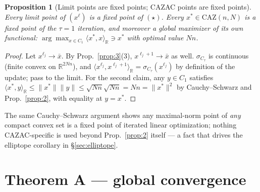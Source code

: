 \documentclass[11pt]{article}
\theoremstyle{plain}
\newtheorem{proposition}[theorem]{Proposition}
\theoremstyle{definition}
\theoremstyle{remark}
\newcommand{\R}{\mathbb R}
\newcommand{\CAZ}{\mathrm{CAZ}}
\begin{document}
\begin{proposition}[Limit points are fixed points; CAZAC points are fixed points]\label{prop:4}
Every limit point of $(x^\ell)$ is a fixed point of $(\star)$. Every
$x^*\in\CAZ(n,N)$ is a fixed point of the $\tau=1$ iteration, and moreover
a global maximizer of its own functional:
$\arg\max_{x\in C_1}\langle x^*,x\rangle_\R\ni x^*$ with optimal value $Nn$.
\end{proposition}
\begin{proof}
Let $x^{\ell_j}\to\bar x$. By Prop.~\ref{prop:3}(3), $x^{\ell_j+1}\to\bar x$
as well. $\sigma_{C_\tau}$ is continuous (finite convex on $\R^{2Nn}$), and
$\langle x^{\ell_j},x^{\ell_j+1}\rangle_\R=\sigma_{C_\tau}(x^{\ell_j})$ by
definition of the update; pass to the limit. For the second claim, any
$y\in C_1$ satisfies $\langle x^*,y\rangle_\R\le\|x^*\|\|y\|\le\sqrt{Nn}\sqrt{Nn}=Nn=\|x^*\|^2$
by Cauchy--Schwarz and Prop.~\ref{prop:2}, with equality at $y=x^*$.
\end{proof}

The same Cauchy--Schwarz argument shows any maximal-norm point of \emph{any}
compact convex set is a fixed point of iterated linear optimization;
nothing CAZAC-specific is used beyond Prop.~\ref{prop:2} itself --- a fact
that drives the elliptope corollary in \S\ref{sec:elliptope}.

\section{Theorem A --- global convergence}
\end{document}
